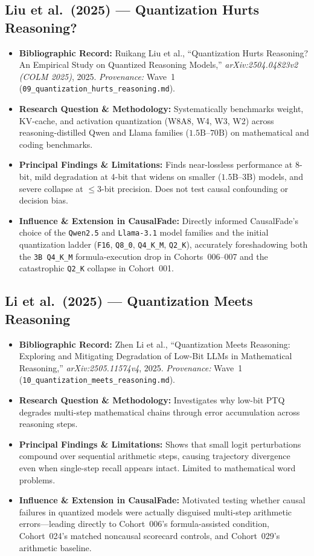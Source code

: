 \subsection{Liu et al.\ (2025) --- Quantization Hurts Reasoning? \citep{liu2025hurts}}
\begin{itemize}
  \item \textbf{Bibliographic Record:} Ruikang Liu et al., ``Quantization Hurts Reasoning? An Empirical Study on Quantized Reasoning Models,'' \emph{arXiv:2504.04823v2 (COLM 2025)}, 2025. \emph{Provenance:} Wave~1 (\texttt{09\_quantization\_hurts\_reasoning.md}).
  \item \textbf{Research Question \& Methodology:} Systematically benchmarks weight, KV-cache, and activation quantization (W8A8, W4, W3, W2) across reasoning-distilled Qwen and Llama families ($1.5\text{B}$--$70\text{B}$) on mathematical and coding benchmarks.
  \item \textbf{Principal Findings \& Limitations:} Finds near-lossless performance at 8-bit, mild degradation at 4-bit that widens on smaller ($1.5\text{B}$--$3\text{B}$) models, and severe collapse at $\le 3$-bit precision. Does not test causal confounding or decision bias.
  \item \textbf{Influence \& Extension in CausalFade:} Directly informed CausalFade's choice of the \texttt{Qwen2.5} and \texttt{Llama-3.1} model families and the initial quantization ladder (\texttt{F16}, \texttt{Q8\_0}, \texttt{Q4\_K\_M}, \texttt{Q2\_K}), accurately foreshadowing both the \texttt{3B Q4\_K\_M} formula-execution drop in Cohorts~006--007 and the catastrophic \texttt{Q2\_K} collapse in Cohort~001.
\end{itemize}

\subsection{Li et al.\ (2025) --- Quantization Meets Reasoning \citep{li2025meets}}
\begin{itemize}
  \item \textbf{Bibliographic Record:} Zhen Li et al., ``Quantization Meets Reasoning: Exploring and Mitigating Degradation of Low-Bit LLMs in Mathematical Reasoning,'' \emph{arXiv:2505.11574v4}, 2025. \emph{Provenance:} Wave~1 (\texttt{10\_quantization\_meets\_reasoning.md}).
  \item \textbf{Research Question \& Methodology:} Investigates why low-bit PTQ degrades multi-step mathematical chains through error accumulation across reasoning steps.
  \item \textbf{Principal Findings \& Limitations:} Shows that small logit perturbations compound over sequential arithmetic steps, causing trajectory divergence even when single-step recall appears intact. Limited to mathematical word problems.
  \item \textbf{Influence \& Extension in CausalFade:} Motivated testing whether causal failures in quantized models were actually disguised multi-step arithmetic errors---leading directly to Cohort~006's formula-assisted condition, Cohort~024's matched noncausal scorecard controls, and Cohort~029's arithmetic baseline.
\end{itemize}

